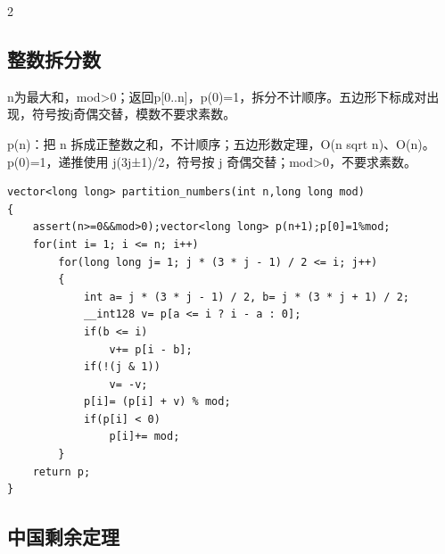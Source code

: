 \documentclass[UTF8,fontset=fandol,a4paper,twoside]{ctexart}
\newcommand{\note}[1]{{\fontsize{10}{12}\selectfont #1\par}}
\begin{document}
\begin{multicols}{2}
\subsection{整数拆分数}

\note{n为最大和，mod>\allowbreak{}0；返回p[\allowbreak{}0.\allowbreak{}.\allowbreak{}n]\allowbreak{}，p(\allowbreak{}0)\allowbreak{}=\allowbreak{}1，拆分不计顺序。五边形下标成对出现，符号按j奇偶交替，模数不要求素数。}
\note{p(\allowbreak{}n)\allowbreak{}：把 n 拆成正整数之和，不计顺序；五边形数定理，O(\allowbreak{}n sqrt n)\allowbreak{}、O(\allowbreak{}n)\allowbreak{}。 p(\allowbreak{}0)\allowbreak{}=\allowbreak{}1，递推使用 j(\allowbreak{}3j±1)\allowbreak{}/\allowbreak{}2，符号按 j 奇偶交替；mod>\allowbreak{}0，不要求素数。}
\begin{lstlisting}
vector<long long> partition_numbers(int n,long long mod)
{
    assert(n>=0&&mod>0);vector<long long> p(n+1);p[0]=1%mod;
    for(int i= 1; i <= n; i++)
        for(long long j= 1; j * (3 * j - 1) / 2 <= i; j++)
        {
            int a= j * (3 * j - 1) / 2, b= j * (3 * j + 1) / 2;
            __int128 v= p[a <= i ? i - a : 0];
            if(b <= i)
                v+= p[i - b];
            if(!(j & 1))
                v= -v;
            p[i]= (p[i] + v) % mod;
            if(p[i] < 0)
                p[i]+= mod;
        }
    return p;
}
\end{lstlisting}
\subsection{中国剩余定理}


\end{multicols}
\end{document}
